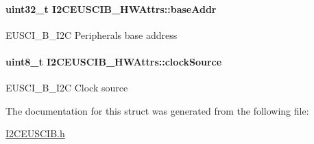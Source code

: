 \paragraph[{base\+Addr}]{\setlength{\rightskip}{0pt plus 5cm}uint32\+\_\+t I2\+C\+E\+U\+S\+C\+I\+B\+\_\+\+H\+W\+Attrs\+::base\+Addr}\label{struct_i2_c_e_u_s_c_i_b___h_w_attrs_ac629f3dec6ed52e4f6696c301000c0ac}
E\+U\+S\+C\+I\+\_\+\+B\+\_\+\+I2\+C Peripheral\textquotesingle{}s base address 
\paragraph[{clock\+Source}]{\setlength{\rightskip}{0pt plus 5cm}uint8\+\_\+t I2\+C\+E\+U\+S\+C\+I\+B\+\_\+\+H\+W\+Attrs\+::clock\+Source}\label{struct_i2_c_e_u_s_c_i_b___h_w_attrs_ae90808e5895254b06d72a2c83f4f0987}
E\+U\+S\+C\+I\+\_\+\+B\+\_\+\+I2\+C Clock source 

The documentation for this struct was generated from the following file\+:\begin{DoxyCompactItemize}
\item 
\hyperlink{_i2_c_e_u_s_c_i_b_8h}{I2\+C\+E\+U\+S\+C\+I\+B.\+h}\end{DoxyCompactItemize}
